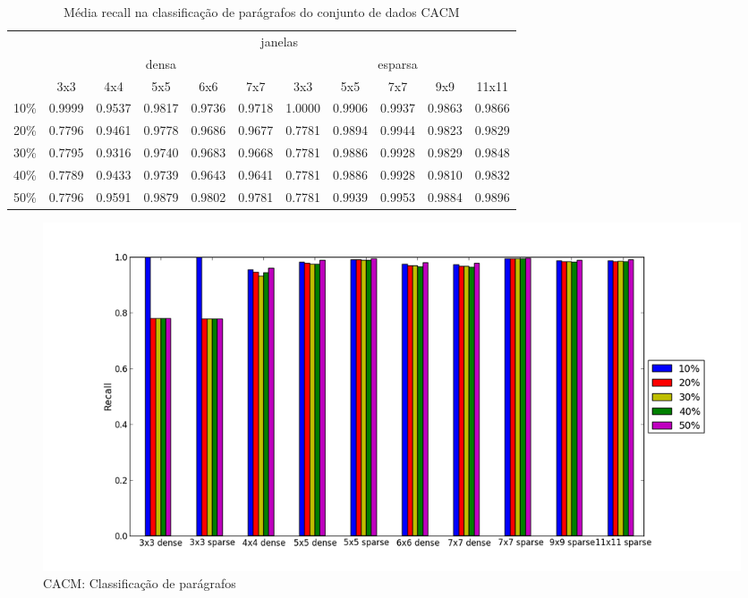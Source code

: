 \documentclass[a4paper,11pt]{article}
\begin{document}
  \begin{center}
    \begin{table}[p]
      \caption{Média recall na classificação de parágrafos do conjunto de dados CACM}
      \begin{tabular}{ l | c c c c c || c c c c c | }
        \cline{2-11}
        & \multicolumn{10}{|c|}{janelas} \\
        \cline{2-11}
        & \multicolumn{5}{c||}{densa} & \multicolumn{5}{c|}{esparsa} \\
        \cline{2-11}
        & 3x3 & 4x4 & 5x5 & 6x6 & 7x7 & 3x3 & 5x5 & 7x7 & 9x9 & 11x11 \\
        \hline
        \multicolumn{1}{|l|}{10\%}& 0.9999& 0.9537& 0.9817& 0.9736& 0.9718& 1.0000& 0.9906& 0.9937& 0.9863& 0.9866\\
        \multicolumn{1}{|l|}{20\%}& 0.7796& 0.9461& 0.9778& 0.9686& 0.9677& 0.7781& 0.9894& 0.9944& 0.9823& 0.9829\\
        \multicolumn{1}{|l|}{30\%}& 0.7795& 0.9316& 0.9740& 0.9683& 0.9668& 0.7781& 0.9886& 0.9928& 0.9829& 0.9848\\
        \multicolumn{1}{|l|}{40\%}& 0.7789& 0.9433& 0.9739& 0.9643& 0.9641& 0.7781& 0.9886& 0.9928& 0.9810& 0.9832\\
        \multicolumn{1}{|l|}{50\%}& 0.7796& 0.9591& 0.9879& 0.9802& 0.9781& 0.7781& 0.9939& 0.9953& 0.9884& 0.9896\\
        \hline  
      \end{tabular}
      \label{tab:cacm_recall_paragraph}
    \end{table}
  \end{center}

  \begin{figure}[p]
    \centerline{\includegraphics[width=1.2\textwidth]{assets/experiment_charts/cacm_TextRegion_paragraph_recall_or_sensitivity.png}}
    \caption{CACM: Classificação de parágrafos}
    \label{fig:cacm_TextRegion_paragraph_recall_or_sensitivity}
  \end{figure}
\end{document}
